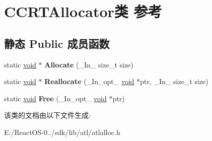 \hypertarget{class_c_c_r_t_allocator}{}\section{C\+C\+R\+T\+Allocator类 参考}
\label{class_c_c_r_t_allocator}
\subsection*{静态 Public 成员函数}
\begin{DoxyCompactItemize}
\item 
\mbox{\label{class_c_c_r_t_allocator_a24ee76263388eefaa8e3cb6fbc9a7016}} 
static \hyperlink{interfacevoid}{void} $\ast$ {\bfseries Allocate} (\+\_\+\+In\+\_\+ size\+\_\+t size)
\item 
\mbox{\label{class_c_c_r_t_allocator_a6956620e6df945f51f3f069b68a037cf}} 
static \hyperlink{interfacevoid}{void} $\ast$ {\bfseries Reallocate} (\+\_\+\+In\+\_\+opt\+\_\+ \hyperlink{interfacevoid}{void} $\ast$ptr, \+\_\+\+In\+\_\+ size\+\_\+t size)
\item 
\mbox{\label{class_c_c_r_t_allocator_a5ecd998f477c95ebe1e1d2f8187133a7}} 
static \hyperlink{interfacevoid}{void} {\bfseries Free} (\+\_\+\+In\+\_\+opt\+\_\+ \hyperlink{interfacevoid}{void} $\ast$ptr)
\end{DoxyCompactItemize}


该类的文档由以下文件生成\+:\begin{DoxyCompactItemize}
\item 
E\+:/\+React\+O\+S-\/0../sdk/lib/atl/atlalloc.\+h\end{DoxyCompactItemize}
